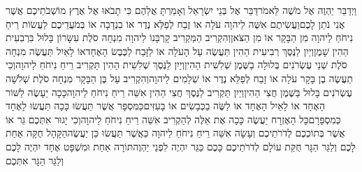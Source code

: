 \documentclass[../main/main.tex]{subfiles}
\begin{document}
\begin{multicols*}{\ncols}
וַיְדַבֵּר יַהְוֶה אֶל מֹשֶׁה לֵּאמֹר\PreVerseSpace{}דַּבֵּר אֶל בְּנֵי יִשְׂרָאֵל וְאָמַרְתָּ אֲלֵהֶם כִּי תָבֹאוּ אֶל אֶרֶץ מוֹשְׁבֹתֵיכֶם אֲשֶׁר אֲנִי נֹתֵן לָכֶם\PreVerseSpace{}וַעֲשִׂיתֶם אִשֶּׁה לַיהוָה עֹלָה אוֹ זֶבַח לְפַלֵּא נֶדֶר אוֹ בִנְדָבָה אוֹ בְּמֹעֲדֵיכֶם לַעֲשׂוֹת רֵיחַ נִיחֹחַ לַיהוָה מִן הַבָּקָר אוֹ מִן הַצֹּאן\PreVerseSpace{}וְהִקְרִיב הַמַּקְרִיב קָרְבָּנוֹ לַיהוָה מִנְחָה סֹלֶת עִשָּׂרוֹן בָּלוּל בִּרְבִעִית הַהִין שָׁמֶן\PreVerseSpace{}וְיַיִן לַנֶּסֶךְ רְבִיעִית הַהִין תַּעֲשֶׂה עַל הָעֹלָה אוֹ לַזָּבַח לַכֶּבֶשׂ הָאֶחָד\PreVerseSpace{}אוֹ לָאַיִל תַּעֲשֶׂה מִנְחָה סֹלֶת שְׁנֵי עֶשְׂרֹנִים בְּלוּלָה בַשֶּׁמֶן שְׁלִשִׁית הַהִין\PreVerseSpace{}וְיַיִן לַנֶּסֶךְ שְׁלִשִׁית הַהִין תַּקְרִיב רֵיחַ נִיחֹחַ לַיהוָה\PreVerseSpace{}וְכִי תַעֲשֶׂה בֶן בָּקָר עֹלָה אוֹ זָבַח לְפַלֵּא נֶדֶר אוֹ שְׁלָמִים לַיהוָה\PreVerseSpace{}וְהִקְרִיב עַל בֶּן הַבָּקָר מִנְחָה סֹלֶת שְׁלֹשָׁה עֶשְׂרֹנִים בָּלוּל בַּשֶּׁמֶן חֲצִי הַהִין\PreVerseSpace{}וְיַיִן תַּקְרִיב לַנֶּסֶךְ חֲצִי הַהִין אִשֵּׁה רֵיחַ נִיחֹחַ לַיהוָה\PreVerseSpace{}כָּכָה יֵעָשֶׂה לַשּׁוֹר הָאֶחָד אוֹ לָאַיִל הָאֶחָד אוֹ לַשֶּׂה בַכְּבָשִׂים אוֹ בָעִזִּים\PreVerseSpace{}כַּמִּסְפָּר אֲשֶׁר תַּעֲשׂוּ כָּכָה תַּעֲשׂוּ לָאֶחָד כְּמִסְפָּרָם\PreVerseSpace{}כָּל הָאֶזְרָח יַעֲשֶׂה כָּכָה אֶת אֵלֶּה לְהַקְרִיב אִשֵּׁה רֵיחַ נִיחֹחַ לַיהוָה\PreVerseSpace{}וְכִי יָגוּר אִתְּכֶם גֵּר אוֹ אֲשֶׁר בְּתוֹכְכֶם לְדֹרֹתֵיכֶם וְעָשָׂה אִשֵּׁה רֵיחַ נִיחֹחַ לַיהוָה כַּאֲשֶׁר תַּעֲשׂוּ כֵּן יַעֲשֶׂה\PreVerseSpace{}הַקָּהָל חֻקָּה אַחַת לָכֶם וְלַגֵּר הַגָּר חֻקַּת עוֹלָם לְדֹרֹתֵיכֶם כָּכֶם כַּגֵּר יִהְיֶה לִפְנֵי יַהְוֶה\PreVerseSpace{}תּוֹרָה אַחַת וּמִשְׁפָּט אֶחָד יִהְיֶה לָכֶם וְלַגֵּר הַגָּר אִתְּכֶם\OpenSection{}\par

\end{multicols*}
\end{document}
